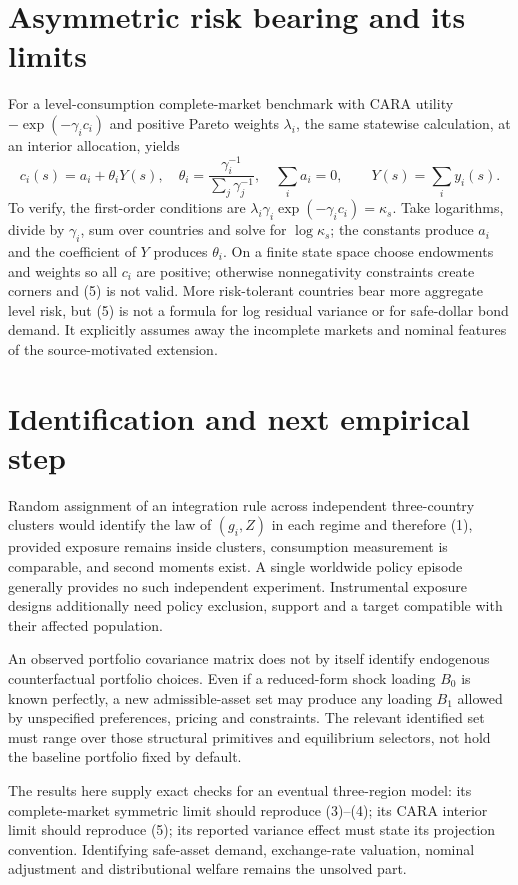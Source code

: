 \documentclass[11pt]{article}
\theoremstyle{definition}
\begin{document}
\section*{Asymmetric risk bearing and its limits}
For a level-consumption complete-market benchmark with CARA utility
$-\exp(-\gamma_i c_i)$ and positive Pareto weights $\lambda_i$, the same
statewise calculation, at an interior allocation, yields
\[
 c_i(s)=a_i+\theta_iY(s),\quad
 \theta_i=\frac{\gamma_i^{-1}}{\sum_j\gamma_j^{-1}},\quad
 \sum_i a_i=0,\qquad Y(s)=\sum_i y_i(s).                 \tag{5}
\]
To verify, the first-order conditions are
$\lambda_i\gamma_i\exp(-\gamma_i c_i)=\kappa_s$.
Take logarithms, divide by $\gamma_i$, sum over countries and solve for
$\log\kappa_s$; the constants produce $a_i$ and the coefficient of $Y$
produces $\theta_i$. On a finite state space choose endowments and weights
so all $c_i$ are positive; otherwise nonnegativity constraints create corners
and (5) is not valid. More risk-tolerant countries bear more aggregate level
risk, but (5) is not a formula for log residual variance or for safe-dollar
bond demand. It explicitly assumes away the incomplete markets and nominal
features of the source-motivated extension.

\section*{Identification and next empirical step}
Random assignment of an integration rule across independent three-country
clusters would identify the law of $(g_i,Z)$ in each regime and therefore (1),
provided exposure remains inside clusters, consumption measurement is comparable,
and second moments exist. A single worldwide policy episode generally provides
no such independent experiment. Instrumental exposure designs additionally need
policy exclusion, support and a target compatible with their affected population.

An observed portfolio covariance matrix does not by itself identify endogenous
counterfactual portfolio choices. Even if a reduced-form shock loading $B_0$
is known perfectly, a new admissible-asset set may produce any loading $B_1$
allowed by unspecified preferences, pricing and constraints. The relevant
identified set must range over those structural primitives and equilibrium
selectors, not hold the baseline portfolio fixed by default.

The results here supply exact checks for an eventual three-region model: its
complete-market symmetric limit should reproduce (3)--(4); its CARA interior
limit should reproduce (5); its reported variance effect must state its
projection convention. Identifying safe-asset demand, exchange-rate valuation,
nominal adjustment and distributional welfare remains the unsolved part.
\end{document}
